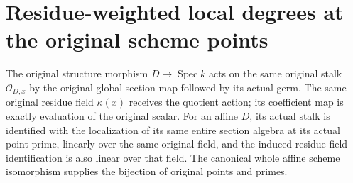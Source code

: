 \section{Residue-weighted local degrees at the original scheme points}

\begin{definition}
\label{def:fc-affine-scheme-local-coefficients}
\leanok
{}
The original structure morphism $D\to\operatorname{Spec}k$ acts on the same
original stalk $\mathcal O_{D,x}$ by the original global-section map followed
by its actual germ. The same original residue field $\kappa(x)$ receives
the quotient action; its coefficient map is exactly evaluation of the
original scalar. For an affine $D$, its actual stalk is identified with
the localization of its same entire section algebra at its actual point
prime, linearly over the same original field, and the induced residue-field
identification is also linear over that field. The canonical whole affine
scheme isomorphism supplies the bijection of original points and primes.
\end{definition}

